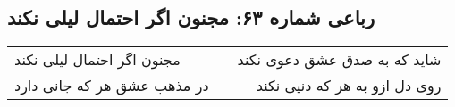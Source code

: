 \begin{center}
\section*{رباعی شماره ۶۳: مجنون اگر احتمال لیلی نکند}
\label{sec:063}
\begin{longtable}{l p{0.5cm} r}
مجنون اگر احتمال لیلی نکند
&&
شاید که به صدق عشق دعوی نکند
\\
در مذهب عشق هر که جانی دارد
&&
روی دل ازو به هر که دنیی نکند
\\
\end{longtable}
\end{center}
